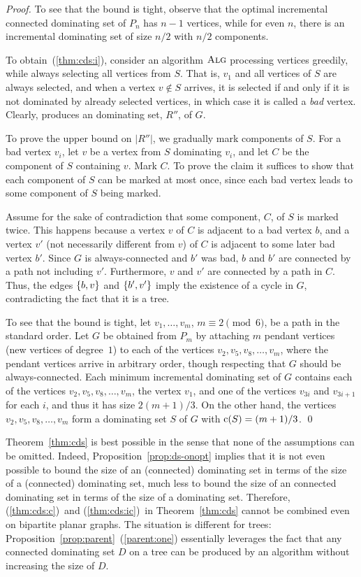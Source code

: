 \begin{proof}
To see that the bound is tight, observe that the optimal incremental
connected dominating set 
of $P_n$ has $n-1$ vertices, while for even $n$, there is an
incremental dominating set of size $n/2$ with $n/2$ components.

To obtain~(\ref{thm:cds:i}),
consider an algorithm $\operatorname{\textsc{Alg}}$ processing vertices greedily,
while always selecting all 
vertices from $S$. That is, $v_1$ and all vertices of $S$ are always selected,
and when a vertex $v \not\in S$ arrives, it is selected
 if and only if it is not dominated by already selected vertices, in which case
it is called a \emph{bad} vertex.
Clearly, \ALG produces an \incr dominating set, $R''$, of $G$. 

To prove the upper bound on $|R''|$, we gradually mark components of $S$.
For a bad vertex $v_i$, let $v$ be
a vertex from $S$ dominating $v_i$, and let $C$ be the component of $S$
containing $v$.
Mark $C$.
To prove the claim it suffices to show that each component of $S$ can
be marked at most once, since each bad vertex leads to some component
of $S$ being marked.

Assume for the sake of contradiction that some component, $C$, of
$S$ is marked twice.
This happens because a vertex $v$ of $C$ is adjacent to a bad vertex $b$,
and a vertex $v'$ (not necessarily different from $v$) of $C$ is
adjacent to some later bad vertex $b'$. 
Since $G$ is always-connected and $b'$ was bad, 
$b$ and $b'$ are connected by a path not
including $v'$.
Furthermore, $v$ and $v'$ are connected by a path in $C$. Thus, the
edges $\left\{b,v\right\}$ and 
$\left\{b',v'\right\}$ imply the existence of a cycle in $G$,
contradicting the fact that it is a tree.

To see that the bound is tight, let $v_1,\ldots, v_m$, $m \equiv 2 \pmod 6$,
be a path in the standard order.  Let $G$ be obtained from
$P_m$ by attaching $m$ pendant vertices (new vertices of degree~$1$) to
each of the vertices $v_2, v_5, v_8,\ldots, v_m$, where the pendant
vertices arrive in arbitrary order, though respecting that
$G$ should be always-connected.
Each minimum incremental dominating set of
$G$ contains each of the vertices $v_2, v_5, v_8,\ldots, v_m$,
the vertex $v_1$, and one of the vertices $v_{3i}$ and $v_{3i+1}$ for
each $i$, and thus it has size $2(m+1)/3$.  On the other hand, the
vertices $v_2, v_5, v_8,\ldots, v_m$ form a dominating set $S$ of $G$
with $\mathrm{c}(S) = (m+1)/3$.
\qed\end{proof}

Theorem~\ref{thm:cds} is best possible
in the sense that none of the assumptions can be omitted.
Indeed, Proposition~\ref{prop:ds-onopt} implies that it is not even
possible to bound
the size of an \incr (connected) dominating set in terms of the size
of a (connected) dominating set, much less
to bound the size of an \incr connected dominating set in terms of the
size of a dominating set. 
Therefore, (\ref{thm:cds:c})~and (\ref{thm:cds:ic})~in Theorem~\ref{thm:cds}
cannot be combined even on bipartite planar graphs.
The situation is different for trees:
Proposition~\ref{prop:parent}~(\ref{parent:one}) essentially leverages the fact
that any connected dominating set $D$ on a tree can
be produced by an \incr algorithm without increasing the size of $D$.



